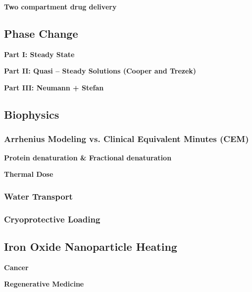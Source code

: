 \begin{example}
\textbf{Two compartment drug delivery}
\end{example}

\subsection{Phase Change}
\begin{example}
\textbf{Part I: Steady State}
\end{example}

\begin{example}
\textbf{Part II: Quasi – Steady Solutions (Cooper and Trezek)}
\end{example}

\begin{example}
\textbf{Part III:  Neumann + Stefan}
\end{example}

\subsection{Biophysics}
\subsubsection{Arrhenius Modeling vs. Clinical Equivalent Minutes (CEM)}
\begin{example}
\textbf{Protein denaturation \& Fractional denaturation}
\end{example}

\begin{example}
\textbf{Thermal Dose}
\end{example}

\subsubsection{Water Transport}
\subsubsection{Cryoprotective Loading}

\subsection{Iron Oxide Nanoparticle Heating}

\begin{example}
\textbf{Cancer}
\end{example}

\begin{example}
\textbf{Regenerative Medicine}
\end{example}